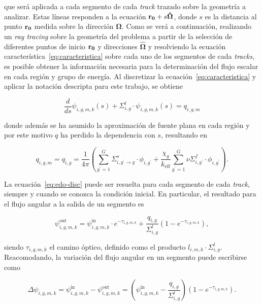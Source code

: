 \documentclass[11pt]{article}
\numberwithin{equation}{section}
\renewcommand{\vec}[1]{\ensuremath\mathbf{#1}}
\begin{document}
\noindent
que será aplicada a cada segmento de cada \emph{track} trazado sobre la geometría a analizar. Estas líneas responden a la ecuación $\vec{r_0}+s\boldsymbol{\hat{\Omega}}$, donde $s$ es la distancia al punto $\vec{r_0}$ medida sobre la dirección $\boldsymbol{\hat{\Omega}}$. Como se verá a continuación, realizando un \emph{ray tracing} sobre la geometría del problema a partir de la selección de diferentes puntos de inicio $\vec{r_0}$ y direcciones $\boldsymbol{\hat{\Omega}}$ y resolviendo la ecuación característica~\eqref{eq:caracteristica} sobre cada uno de los segmentos de cada \emph{tracks}, es posible obtener la información necesaria para la determinación del flujo escalar en cada región y grupo de energía. Al discretizar la ecuación~\eqref{eq:caracteristica} y aplicar la notación descripta para este trabajo, se obtiene

\begin{equation} \label{eq:edo-disc}
 \frac{d}{ds}\psi_{i,g,m,k} (s)
 + \Sigma^t_{i,g} \cdot \psi_{i,g,m,k} (s) = 
 q_{i,g,m}
\end{equation}

\noindent
donde además se ha asumido la aproximación de fuente plana en cada región y por este motivo $q$ ha perdido la dependencia con $s$, resultando en

\begin{equation} \label{eq:fuente-isotropica}
 q_{i,g,m} = q_{i,g} = 
 \frac{1}{4\pi} \left(
 \sum_{g^\prime=1}^G \Sigma^s_{i,g^\prime \rightarrow g} \cdot \phi_{i,g^\prime}
 + \frac{\chi_g}{k_{\text{eff}}} \sum_{g^\prime=1}^G \nu\Sigma^f_{i,g^\prime} \cdot \phi_{i,g^\prime}
 \right).
\end{equation}

La ecuación~\eqref{eq:edo-disc} puede ser resuelta para cada segmento de cada \emph{track}, siempre y cuando se conozca la condici\'on inicial. En particular, el resultado para el flujo angular a la salida de un segmento es

\begin{equation}
 \psi^{\text{out}}_{i,g,m,k} = \psi^{\text{in}}_{i,g,m,k} \cdot e^{-\tau_{i,g,m,k}}
 + \frac{q_{i,g}}{\Sigma^t_{i,g}} \left(1 - e^{-\tau_{i,g,m,k}} \right),
\end{equation}

\noindent
siendo $\tau_{i,g,m,k}$ el camino óptico, definido como el producto $l_{i,m,k} \cdot \Sigma^t_{i,g}$. Reacomodando, la variación del flujo angular en un segmento puede escribirse como

\begin{equation} \label{eq:delta-psi}
 \Delta \psi_{i,g,m,k} = 
 \psi^{\text{in}}_{i,g,m,k} - \psi^{\text{out}}_{i,g,m,k} = 
 \left( \psi^{\text{in}}_{i,g,m,k} - \frac{q_{i,g}}{\Sigma^t_{i,g}} \right) \left(1 - e^{-\tau_{i,g,m,k}} \right).
\end{equation}
\end{document}
